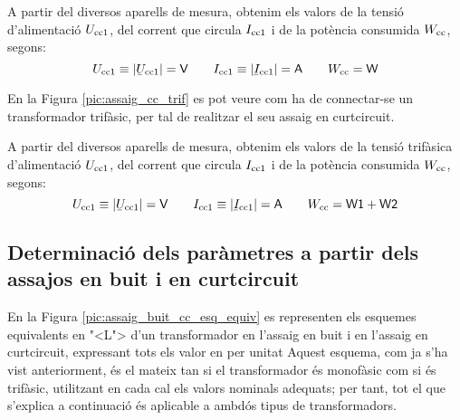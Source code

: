 A partir del diversos aparells de mesura, obtenim els valors de la
tensi\'{o} d'alimentaci\'{o} $U_\mathrm{cc1}$, del corrent que circula
$I_\mathrm{cc1}$ i de la pot\`{e}ncia consumida $W_\mathrm{cc}$, segons:
\begin{equation}
    U\ped{cc1}\equiv|\cmplx{U}\ped{cc1}|=\textsf{V} \qquad
    I\ped{cc1}\equiv|\cmplx{I}\ped{cc1}|=\textsf{A}
     \qquad W\ped{cc}=\textsf{W}
\end{equation}

En la Figura \vref{pic:assaig_cc_trif} es pot veure com ha de
connectar-se un transformador trif\`{a}sic, per tal de realitzar el seu
assaig en curtcircuit.

\begin{center}
    
    \label{pic:assaig_cc_trif}
\end{center}


A partir del diversos aparells de mesura, obtenim els valors de la
tensi\'{o} trif\`{a}sica d'alimentaci\'{o} $U_\mathrm{cc1}$, del corrent que circula
$I_\mathrm{cc1}$ i de la pot\`{e}ncia consumida $W_\mathrm{cc}$, segons:
\begin{equation}
    U\ped{cc1}\equiv|\cmplx{U}\ped{cc1}|=\textsf{V} \qquad
    I\ped{cc1}\equiv|\cmplx{I}\ped{cc1}|=\textsf{A} \qquad
    W\ped{cc}=\textsf{W1}+\textsf{W2}
\end{equation}

\subsection{Determinaci\'{o} dels par\`{a}metres a partir dels assajos en buit i en curtcircuit}

En la Figura \vref{pic:assaig_buit_cc_esq_equiv}  es representen els
esquemes equivalents en {"<}L{">} d'un transformador en l'assaig en buit i
en l'assaig en curtcircuit, expressant tots els valor en per unitat
Aquest esquema, com ja s'ha vist anteriorment, \'{e}s el mateix tan si
el transformador \'{e}s monof\`{a}sic com si \'{e}s trif\`{a}sic, utilitzant en cada
cal els valors nominals adequats; per tant, tot el que s'explica  a
continuaci\'{o} \'{e}s aplicable a ambd\'{o}s tipus de transformadors.

\begin{center}
    
     \label{pic:assaig_buit_cc_esq_equiv}
\end{center}

